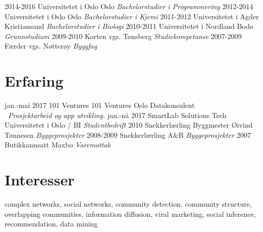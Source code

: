\documentclass[]{friggeri-cv}
\begin{document}
\begin{entrylist}
  \entry
    {2014-2016}
    {Universitetet i Oslo}
    {Oslo}
    {\emph{Bachelorstudier i Programmering}}
  \entry
    {2012-2014}
    {Universitetet i Oslo}
    {Oslo}
    {\emph{Bachelorstudier i Kjemi}}  
  \entry
    {2011-2012}
    {Universitetet i Agder}
    {Kristiansand}
    {\emph{Bachelorstudier i Biologi}}
  \entry
    {2010-2011}
    {Universitetet i Nordland}
    {Bodø}
    {\emph{Grunnstudium}}
  \entry
    {2009-2010}
    {Korten vgs.}
    {Tønsberg}
    {\emph{Studiekompetanse}}
  \entry
    {2007-2009}
    {Færder vgs.}
    {Nøtterøy}
    {\emph{Byggfag}}
\end{entrylist}

\section{Erfaring}

\begin{entrylist}
  \entry
    {jan.-mai \hfill 2017}
    {101 Ventures}
    {101 Ventures Oslo}
    {Datakonsulent \\\ \emph{Prosjektarbeid og app utvikling.}}
  \entry
    {jan.-nå \hfill 2017}
    {SmartLab Solutions Tech}
    {Universitetet i Oslo / BI}
    {\emph{Studentbedrift}}
  \entry
    {\hfill 2010}
    {Snekkerlærling}
    {Byggmester Øivind Tønnesen}
    {\emph{Byggeprosjekter}}
  \entry
    {\hfill 2008-2009}
    {Snekkerlærling}
    {A\&B}
    {\emph{Byggeprosjekter}}
  \entry
    {\hfill 2007}
    {Butikkannsatt}
    {Maxbo}
    {\emph{Varemottak}}

\end{entrylist}

\section{Interesser}
complex networks, social networks, community detection, community structure,
overlapping communities, information diffusion, viral marketing, social
inference, recommendation, data mining
\end{document}
